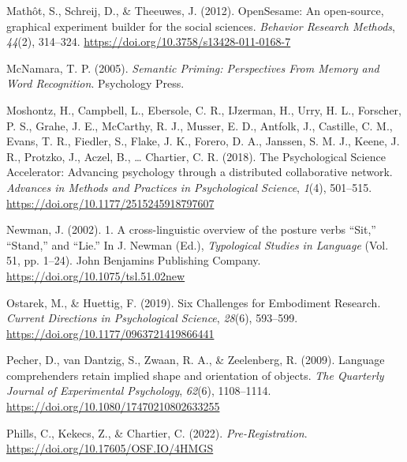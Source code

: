 \documentclass[
  man,floatsintext]{apa7}
\newlength{\cslhangindent}
\newlength{\cslentryspacingunit} %
\newenvironment{CSLReferences}[2] %
 {%
  \setlength{\parindent}{0pt}
  \ifodd #1
  \let\oldpar\par
  \def\par{\hangindent=\cslhangindent\oldpar}
  \fi
  \setlength{\parskip}{#2\cslentryspacingunit}
 }%
 {}
\begin{document}
\begin{CSLReferences}{1}{0}
\leavevmode{}%
Mathôt, S., Schreij, D., \& Theeuwes, J. (2012). {OpenSesame}: {An} open-source, graphical experiment builder for the social sciences. \emph{Behavior Research Methods}, \emph{44}(2), 314--324. \url{https://doi.org/10.3758/s13428-011-0168-7}

\leavevmode{}%
McNamara, T. P. (2005). \emph{Semantic {Priming}: {Perspectives From Memory} and {Word Recognition}}. {Psychology Press}.

\leavevmode{}%
Moshontz, H., Campbell, L., Ebersole, C. R., IJzerman, H., Urry, H. L., Forscher, P. S., Grahe, J. E., McCarthy, R. J., Musser, E. D., Antfolk, J., Castille, C. M., Evans, T. R., Fiedler, S., Flake, J. K., Forero, D. A., Janssen, S. M. J., Keene, J. R., Protzko, J., Aczel, B., \ldots{} Chartier, C. R. (2018). The {Psychological Science Accelerator}: {Advancing} psychology through a distributed collaborative network. \emph{Advances in Methods and Practices in Psychological Science}, \emph{1}(4), 501--515. \url{https://doi.org/10.1177/2515245918797607}

\leavevmode{}%
Newman, J. (2002). 1. {A} cross-linguistic overview of the posture verbs {``{Sit},''} {``{Stand},''} and {``{Lie}.''} In J. Newman (Ed.), \emph{Typological {Studies} in {Language}} (Vol. 51, pp. 1--24). {John Benjamins Publishing Company}. \url{https://doi.org/10.1075/tsl.51.02new}

\leavevmode{}%
Ostarek, M., \& Huettig, F. (2019). Six {Challenges} for {Embodiment Research}. \emph{Current Directions in Psychological Science}, \emph{28}(6), 593--599. \url{https://doi.org/10.1177/0963721419866441}

\leavevmode{}%
Pecher, D., van Dantzig, S., Zwaan, R. A., \& Zeelenberg, R. (2009). Language comprehenders retain implied shape and orientation of objects. \emph{The Quarterly Journal of Experimental Psychology}, \emph{62}(6), 1108--1114. \url{https://doi.org/10.1080/17470210802633255}

\leavevmode{}%
Phills, C., Kekecs, Z., \& Chartier, C. (2022). \emph{Pre-{Registration}}. \url{https://doi.org/10.17605/OSF.IO/4HMGS}


\end{CSLReferences}
\end{document}
